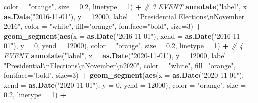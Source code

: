 \documentclass[
]{article}
\newenvironment{Shaded}{\begin{snugshade}}{\end{snugshade}}
\newcommand{\CharTok}[1]{\textcolor[rgb]{0.31,0.60,0.02}{#1}}
\newcommand{\CommentTok}[1]{\textcolor[rgb]{0.56,0.35,0.01}{\textit{#1}}}
\newcommand{\DataTypeTok}[1]{\textcolor[rgb]{0.13,0.29,0.53}{#1}}
\newcommand{\DecValTok}[1]{\textcolor[rgb]{0.00,0.00,0.81}{#1}}
\newcommand{\FloatTok}[1]{\textcolor[rgb]{0.00,0.00,0.81}{#1}}
\newcommand{\KeywordTok}[1]{\textcolor[rgb]{0.13,0.29,0.53}{\textbf{#1}}}
\newcommand{\NormalTok}[1]{#1}
\newcommand{\OperatorTok}[1]{\textcolor[rgb]{0.81,0.36,0.00}{\textbf{#1}}}
\newcommand{\StringTok}[1]{\textcolor[rgb]{0.31,0.60,0.02}{#1}}
\begin{document}
\begin{Shaded}
\begin{Highlighting}[]
               \DataTypeTok{color =} \StringTok{"orange"}\NormalTok{, }\DataTypeTok{size =} \FloatTok{0.2}\NormalTok{, }\DataTypeTok{linetype =} \DecValTok{1}\NormalTok{) }\OperatorTok{+}
\StringTok{  }\CommentTok{# 3 EVENT}
\StringTok{  }\KeywordTok{annotate}\NormalTok{(}\StringTok{"label"}\NormalTok{, }\DataTypeTok{x =} \KeywordTok{as.Date}\NormalTok{(}\StringTok{"2016-11-01"}\NormalTok{), }\DataTypeTok{y =} \DecValTok{12000}\NormalTok{, }
           \DataTypeTok{label =} \StringTok{"Presidential Elections}\CharTok{\textbackslash{}n}\StringTok{November 2016"}\NormalTok{, }\DataTypeTok{color =} \StringTok{"white"}\NormalTok{, }\DataTypeTok{fill=}\StringTok{"orange"}\NormalTok{, }\DataTypeTok{fontface=}\StringTok{"bold"}\NormalTok{, }\DataTypeTok{size=}\DecValTok{3}\NormalTok{) }\OperatorTok{+}
\StringTok{  }\KeywordTok{geom_segment}\NormalTok{(}\KeywordTok{aes}\NormalTok{(}\DataTypeTok{x =} \KeywordTok{as.Date}\NormalTok{(}\StringTok{"2016-11-01"}\NormalTok{), }\DataTypeTok{xend =} \KeywordTok{as.Date}\NormalTok{(}\StringTok{"2016-11-01"}\NormalTok{), }\DataTypeTok{y =} \DecValTok{0}\NormalTok{, }\DataTypeTok{yend =} \DecValTok{12000}\NormalTok{), }
               \DataTypeTok{color =} \StringTok{"orange"}\NormalTok{, }\DataTypeTok{size =} \FloatTok{0.2}\NormalTok{, }\DataTypeTok{linetype =} \DecValTok{1}\NormalTok{) }\OperatorTok{+}
\StringTok{  }\CommentTok{# 4 EVENT}
\StringTok{  }\KeywordTok{annotate}\NormalTok{(}\StringTok{"label"}\NormalTok{, }\DataTypeTok{x =} \KeywordTok{as.Date}\NormalTok{(}\StringTok{"2020-11-01"}\NormalTok{), }\DataTypeTok{y =} \DecValTok{12000}\NormalTok{, }
           \DataTypeTok{label =} \StringTok{"Presidential}\CharTok{\textbackslash{}n}\StringTok{Elections}\CharTok{\textbackslash{}n}\StringTok{November}\CharTok{\textbackslash{}n}\StringTok{2020"}\NormalTok{, }\DataTypeTok{color =} \StringTok{"white"}\NormalTok{, }\DataTypeTok{fill=}\StringTok{"orange"}\NormalTok{, }\DataTypeTok{fontface=}\StringTok{"bold"}\NormalTok{, }\DataTypeTok{size=}\DecValTok{3}\NormalTok{) }\OperatorTok{+}
\StringTok{  }\KeywordTok{geom_segment}\NormalTok{(}\KeywordTok{aes}\NormalTok{(}\DataTypeTok{x =} \KeywordTok{as.Date}\NormalTok{(}\StringTok{"2020-11-01"}\NormalTok{), }\DataTypeTok{xend =} \KeywordTok{as.Date}\NormalTok{(}\StringTok{"2020-11-01"}\NormalTok{), }\DataTypeTok{y =} \DecValTok{0}\NormalTok{, }\DataTypeTok{yend =} \DecValTok{12000}\NormalTok{), }
               \DataTypeTok{color =} \StringTok{"orange"}\NormalTok{, }\DataTypeTok{size =} \FloatTok{0.2}\NormalTok{, }\DataTypeTok{linetype =} \DecValTok{1}\NormalTok{) }\OperatorTok{+}

\end{Highlighting}
\end{Shaded}
\end{document}
